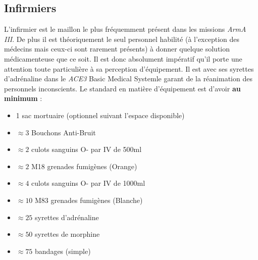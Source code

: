 \documentclass{article}
\newcommand{\arma}{\emph{ArmA III}}
\newcommand{\medsys}{\emph{ACE3} Basic Medical System}
\begin{document}
			\subsection{Infirmiers}
				L'infirmier est le maillon le plus fréquemment présent dans les missions \arma. De plus il est théoriquement le seul personnel habilité (à l'exception des médecins mais ceux-ci sont rarement présents) à donner quelque solution médicamenteuse que ce soit. Il est donc absolument impératif qu'il porte une attention toute particulière à sa perception d'équipement. Il est avec ses syrettes d'adrénaline dans le \medsys le garant de la réanimation des personnels inconscients. Le standard en matière d'équipement est d'avoir \textbf{au minimum} :
				\begin{itemize} %
				    \item 1 sac mortuaire (optionnel suivant l'espace disponible)
				    \item $\approx3$ Bouchons Anti-Bruit
				    \item $\approx2$ culots sanguins O- par IV de 500ml
				    \item $\approx2$ M18 grenades fumigènes (Orange)
				    \item $\approx4$ culots sanguins O- par IV de 1000ml
				    \item $\approx10$ M83 grenades fumigènes (Blanche)
				    \item $\approx25$ syrettes d'adrénaline
				    \item $\approx50$ syrettes de morphine
				    \item $\approx75$ bandages (simple)
				\end{itemize}
			
\end{document}
